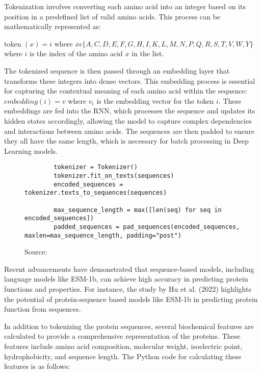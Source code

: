 Tokenization involves converting each amino acid into an integer based on its position in a predefined list of valid amino acids. This process can be mathematically represented as:

token $(x) = i $ where $ x \epsilon \{  A , C , D , E , F , G , H , I , K , L , M , N , P , Q , R , S , T , V , W , Y \}$ where $i$ is the index of the amino acid $x$ in the list.

The tokenized sequence is then passed through an embedding layer that transforms these integers into dense vectors. This embedding process is essential for capturing the contextual meaning of each amino acid within the sequence:
$embedding(i) = v$ where $v_i$ is the embedding vector for the token $i$.
These embeddings are fed into the RNN, which processes the sequence and updates its hidden states accordingly, allowing the model to capture complex dependencies and interactions between amino acids. The sequences are then padded to ensure they all have the same length, which is necessary for batch processing in Deep Learning models.

\begin{figure}[bht]
    \begin{lstlisting}
        tokenizer = Tokenizer()
        tokenizer.fit_on_texts(sequences)
        encoded_sequences = tokenizer.texts_to_sequences(sequences)
        
        max_sequence_length = max([len(seq) for seq in encoded_sequences])
        padded_sequences = pad_sequences(encoded_sequences, maxlen=max_sequence_length, padding="post")
\end{lstlisting}
\caption{Source: \autocite{polleyTobiasPolDeepZyme2024}}
\end{figure}

Recent advancements have demonstrated that sequence-based models, including language models like ESM-1b, can achieve high accuracy in predicting protein functions and properties. For instance, the study by Hu et al. (2022) highlights the potential of protein-sequence based models like ESM-1b in predicting protein function from sequences. \autocite{huExploringEvolutionbasedFree2022}

In addition to tokenizing the protein sequences, several biochemical features are calculated to provide a comprehensive representation of the proteins. These features include amino acid composition, molecular weight, isoelectric point, hydrophobicity, and sequence length. The Python code for calculating these features is as follows:

